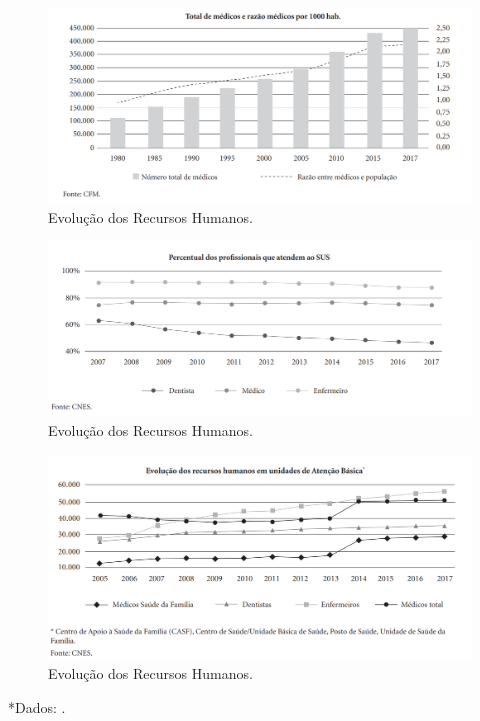 \documentclass[twoside]{article}
\begin{document}
\begin{multicols}{2}
\fi
  \begin{figure}[H]
    \centering
    \includegraphics[scale=0.35]{mil medicos a cade .png}
    \caption{Evolução dos Recursos Humanos.}
    \label{fig2}
  \end{figure}
  
    \begin{figure}[H]
    \centering
    \includegraphics[scale=0.35]{medicos no sus.png}
    \caption{Evolução dos Recursos Humanos.}
    \label{fig2}
  \end{figure}
  
    \begin{figure}[H]
    \centering
    \includegraphics[scale=0.35]{atencao basica.png}
    \caption{Evolução dos Recursos Humanos.}
    \label{fig2}
   \end{figure}
 \begin{footnotesize}  
    *Dados: \cite{Viacava_2018}.
\end{footnotesize}  
 

\end{multicols}
\end{document}
